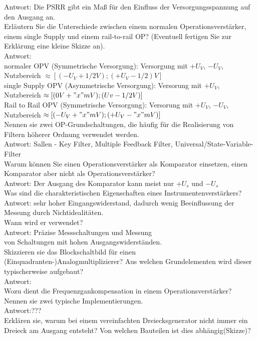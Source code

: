 \documentclass[A4]{scrreprt}
\begin{document}
  \bigskip Antwort: Die PSRR gibt ein Maß für den Einfluss der Versorgungsspannung auf den Ausgang an.\\
  Erläutern Sie die Unterschiede zwischen einem normalen Operationsverstärker, einem single Supply und einem rail-to-rail OP? (Eventuell fertigen Sie zur Erklärung eine kleine Skizze an).\\
  Antwort: \\
  normaler OPV (Symmetrische Versorgung): Versorgung mit $+U_V$, $-U_V$, Nutzbereich $\approx [(-U_V +1/2V); (+U_V -1/2)V]$\\
  single Supply OPV (Asymmetrische Versorgung): Versorung mit $+U_V$, Nutzbereich $\approx [(0V+ "x"mV); (Uv -1/2V)]$ \\
  \bigskip Rail to Rail OPV (Symmetrische Versorgung): Versorung mit $+U_V$, $-U_V$, Nutzbereich $\approx [(-U_V + "x"mV); (+U_V - "x"mV)]$\\
  Nennen sie zwei OP-Grundschaltungen, die häufig für die Realisierung von Filtern höherer Ordnung verwendet werden.\\
  \bigskip 
  Antwort: Sallen - Key Filter, Multiple Feedback Filter, Universal/State-Variable-Filter\\
  Warum können Sie einen Operationsverstärker als Komparator einsetzen, einen Komparator aber nicht als Operationsverstärker?\\
  \bigskip 
  Antwort: Der Ausgang des Komparator kann meist nur $+U_s$ und $-U_s$\\
  \newpage
  Was sind die charakteristischen Eigenschaften eines Instrumentenverstärkers?\\
  Antwort: sehr hoher Eingangswiderstand, dadurch wenig Beeinflussung der Messung durch Nichtidealitäten.\\
  Wann wird er verwendet?\\
  \bigskip 
  Antwort: Präzise Messschaltungen und Messung\\ von Schaltungen mit hohen Ausgangswiderständen.\\
  Skizzieren sie das Blockschaltbild für einen (Einquadranten-)Analogmultiplizierer? Aus welchen Grundelementen wird dieser typischerweise aufgebaut?\\
  \bigskip 
  Antwort:\\
  Wozu dient die Frequenzgankompensation in einem Operationsverstärker? Nennen sie zwei typische Implementierungen.\\
  \bigskip Antwort:??? \\ 
  Erklären sie, warum bei einem vereinfachten Dreiecksgenerator nicht immer ein Dreieck am Ausgang entsteht? Von welchen Bauteilen ist dies abhängig(Skizze)?\\
\end{document}
